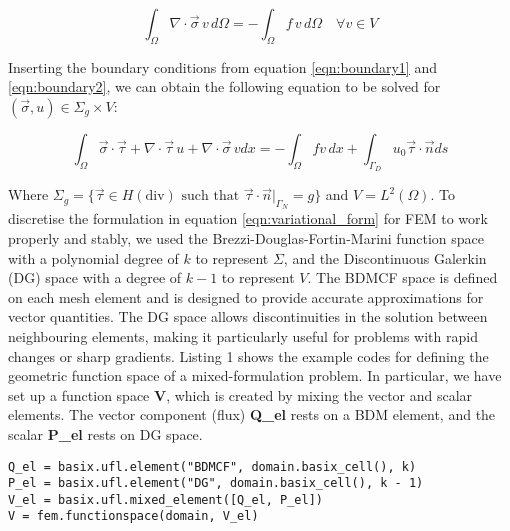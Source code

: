 \begin{equation}
\int_{\Omega} \nabla \cdot \vec{\sigma} \, v \, d\Omega = - \int_{\Omega} f \, v \, d\Omega \quad \forall v \in V
\end{equation}

Inserting the boundary conditions from equation \ref{eqn:boundary1} and \ref{eqn:boundary2}, we can obtain the following equation to be solved for $(\vec{\sigma}, u) \in \Sigma_g \times V$:

\begin{equation}
    \int_{\Omega} \vec{\sigma} \cdot\vec{\tau} + \nabla \cdot \vec{\tau} \, u + \nabla \cdot \vec{\sigma} \, v  dx = -\int_{\Omega} f v \, dx + \int_{\Gamma_{D}} u_0 \vec{\tau} \cdot \vec{n}  ds
    \label{eqn:variational_form}
\end{equation}

Where $\Sigma_g = \{\vec{\tau} \in H(\text{div}) \text{ such that } \vec{\tau} \cdot \vec{n}|_{\Gamma_N} = g\}$ and $V = L^2(\Omega)$. To discretise the formulation in equation \ref{eqn:variational_form} for FEM to work properly and stably, we used the  Brezzi-Douglas-Fortin-Marini function space with a polynomial degree of $k$ to represent $\Sigma$, and the Discontinuous Galerkin (DG) space with a degree of $k-1$ to represent $V$. The BDMCF space is defined on each mesh element and is designed to provide accurate approximations for vector quantities. The DG space allows discontinuities in the solution between neighbouring elements, making it particularly useful for problems with rapid changes or sharp gradients.  Listing 1 shows the example codes for defining the geometric function space of a mixed-formulation problem. In particular, we have set up a function space \textbf{V}, which is created by mixing the vector and scalar elements. The vector component (flux) \textbf{Q\_el} rests on a BDM element, and the scalar \textbf{P\_el} rests on DG space. 

\begin{lstlisting}[frame=single, caption={Defining geometric parameters / Creating function space }]
Q_el = basix.ufl.element("BDMCF", domain.basix_cell(), k)
P_el = basix.ufl.element("DG", domain.basix_cell(), k - 1)
V_el = basix.ufl.mixed_element([Q_el, P_el])
V = fem.functionspace(domain, V_el)
\end{lstlisting}

